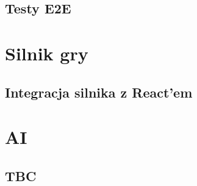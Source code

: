 \subsection{Testy E2E}


\section{Silnik gry}

\subsection{Integracja silnika z React'em}


\section{AI}

\subsection{TBC}

